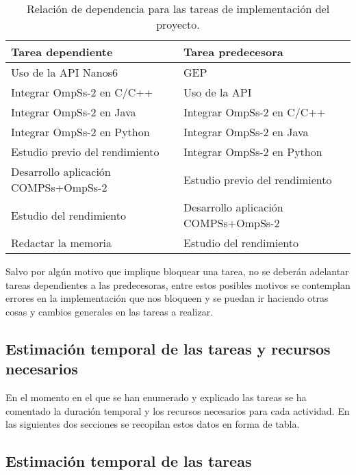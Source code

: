 \begin{table}[H]
 \centering
 \begin{tabular}{|| l | l ||}
    \hline  
    Tarea dependiente & Tarea predecesora \\
    \hline\hline
    Uso de la API Nanos6 & GEP \\
    \hline
    Integrar OmpSs-2 en C/C++ & Uso de la API \\
    \hline
    Integrar OmpSs-2 en Java & Integrar OmpSs-2 en C/C++ \\
    \hline
    Integrar OmpSs-2 en Python & Integrar OmpSs-2 en Java \\
    \hline
    Estudio previo del rendimiento & Integrar OmpSs-2 en Python \\
    \hline
    Desarrollo aplicación COMPSs+OmpSs-2 & Estudio previo del rendimiento \\
    \hline
    Estudio del rendimiento & Desarrollo aplicación COMPSs+OmpSs-2 \\
    \hline
    Redactar la memoria & Estudio del rendimiento \\
    \hline
 \end{tabular}
    \caption{Relación de dependencia para las tareas de implementación del proyecto.}
    \label{table:2}
\end{table}

Salvo por algún motivo que implique bloquear una tarea, no se deberán adelantar tareas dependientes a las predecesoras, entre estos posibles motivos se contemplan errores en la implementación que nos bloqueen y se puedan ir haciendo otras cosas y cambios generales en las tareas a realizar.

\subsection{Estimación temporal de las tareas y recursos necesarios}

En el momento en el que se han enumerado y explicado las tareas se ha comentado la duración temporal y los recursos necesarios para cada actividad. En las siguientes dos secciones se recopilan estos datos en forma de tabla.

\subsection{Estimación temporal de las tareas}

